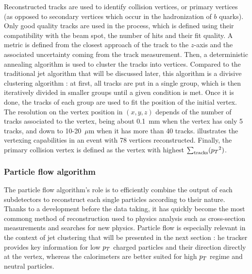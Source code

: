         Reconstructed tracks are used to identify collision vertices, or primary vertices
        (as opposed to secondary vertices which occur in the hadronization of $b$ quarks).
        Only good quality tracks are used in the process, which is defined using their
        compatibility with the beam spot, the number of hits and their fit quality. A
        metric is defined from the closest approach of the track to the $z$-axis and
        the associated uncertainty coming from the track measurement. Then, a deterministic
        annealing algorithm is used to cluster the tracks into vertices. Compared to the
        traditional jet algorithm that will be discussed later, this algorithm is a divisive
        clustering algorithm : at first, all tracks are put in a single group, which is then
        iteratively divided in smaller groups until a given condition is met. Once it is
        done, the tracks of each group are used to fit the position of the initial vertex.
        The resolution on the vertex position in $(x,y,z)$ depends of the number of tracks
        associated to the vertex, being about 0.1~mm when the vertex has only 5 tracks, and
        down to 10-20~$\mu$m when it has more than 40 tracks. 
        illustrates the vertexing capabilities in an event with 78 vertices reconstructed.
        Finally, the primary collision vertex is defined as the vertex with highest
        $\sum_\text{tracks} ({p_T}^2)$.


            \subsubsection{Particle flow algorithm}


        The particle flow algorithm's role is to efficiently combine the output of each
        subdetectors to reconstruct each single particles according to their nature. Thanks
        to a development before the data taking, it has quickly become the most commong
        method of reconstruction used to physics analysis such as cross-section measurements
        and searches for new physics. Particle flow is especially relevant in the context
        of jet clustering that will be presented in the next section : he tracker provides
        key information for low $p_T$ charged particles and their direction directly at the
        vertex, whereas the calorimeters are better suited for high $p_T$ regime and neutral
        particles.

